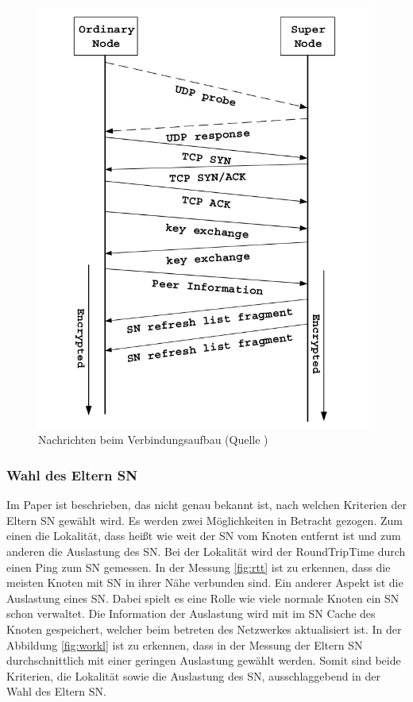 \begin{figure}
\includegraphics[scale=0.3]{gfx/join}
\caption{Nachrichten beim Verbindungsaufbau (Quelle \cite{liang2006fasttrack})}
\label{fig:join}
\end{figure}

\subsubsection{Wahl des Eltern SN}
\label{subsubsec:wElternSN}

Im Paper \cite{liang2006fasttrack} ist beschrieben, das nicht genau bekannt ist, nach welchen Kriterien der Eltern SN gewählt wird. 
Es werden zwei Möglichkeiten in Betracht gezogen.
Zum einen die Lokalität, dass heißt wie weit der SN vom Knoten entfernt ist und zum anderen die Auslastung des SN.
Bei der Lokalität wird der RoundTripTime durch einen Ping zum SN gemessen.
In der Messung \ref{fig:rtt} ist zu erkennen, dass die meisten Knoten mit SN in ihrer Nähe verbunden sind.
Ein anderer Aspekt ist die Auslastung eines SN.
Dabei spielt es eine Rolle wie viele normale Knoten ein SN schon verwaltet.
Die Information der Auslastung wird mit im SN Cache des Knoten gespeichert, welcher beim betreten des Netzwerkes aktualisiert ist.
In der Abbildung \ref{fig:workl} ist zu erkennen, dass in der Messung der Eltern SN durchschnittlich mit einer geringen Auslastung gewählt werden.
Somit sind beide Kriterien, die Lokalität sowie die Auslastung des SN, ausschlaggebend in der Wahl des Eltern SN.

